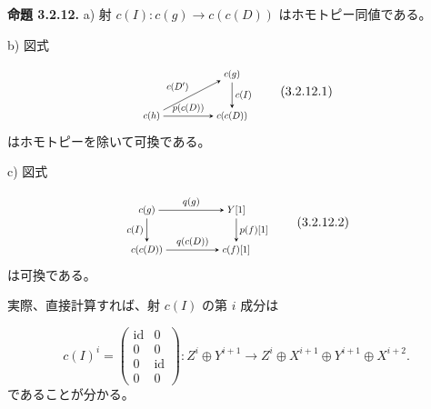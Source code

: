 \clearpage
{}%
\begingroup
\setlength{\abovedisplayskip}{4pt plus 2pt minus 2pt}%
\setlength{\belowdisplayskip}{4pt plus 2pt minus 2pt}%
\noindent\textbf{命題 3.2.12.}\quad
{}
a) 射 $c(I)\colon c(g)\longrightarrow c(c(D))$ はホモトピー同値である。

b) 図式

\begin{equation}
  \begin{tikzpicture}[>=stealth,baseline=(current bounding box.center),scale=0.74,
    every node/.style={transform shape}]
    \node (Ch) at (0,0) {$c(h)$};
    \node (Cg) at (3.0,1.55) {$c(g)$};
    \node (CcD) at (3.0,0) {$c(c(D))$};
    \draw[->] (Ch) -- node[above left] {$c(D')$} (Cg);
    \draw[->] (Cg) -- node[right] {$c(I)$} (CcD);
    \draw[->] (Ch) -- node[above] {$p(c(D))$} (CcD);
  \end{tikzpicture}
  \tag{3.2.12.1}
\end{equation}
はホモトピーを除いて可換である。

c) 図式

\begin{equation}
  \begin{tikzpicture}[>=stealth,baseline=(current bounding box.center),scale=0.76,
    every node/.style={transform shape}]
    \node (Cg) at (0,1.45) {$c(g)$};
    \node (Y) at (3.25,1.45) {$Y[1]$};
    \node (CcD) at (0,0) {$c(c(D))$};
    \node (Cf) at (3.25,0) {$c(f)[1]$};
    \draw[->] (Cg) -- node[above] {$q(g)$} (Y);
    \draw[->] (Cg) -- node[left] {$c(I)$} (CcD);
    \draw[->] (Y) -- node[right] {$p(f)[1]$} (Cf);
    \draw[->] (CcD) -- node[above] {$q(c(D))$} (Cf);
  \end{tikzpicture}
  \tag{3.2.12.2}
\end{equation}
は可換である。

実際、直接計算すれば、射 $c(I)$ の第 $i$ 成分は

\begin{equation}
  c(I)^i=
  \begin{pmatrix}
    \operatorname{id}&0\\
    0&0\\
    0&\operatorname{id}\\
    0&0
  \end{pmatrix}
  \colon Z^i\oplus Y^{i+1}\longrightarrow
  Z^i\oplus X^{i+1}\oplus Y^{i+1}\oplus X^{i+2}.
  \tag{3.2.12.3}
\end{equation}
であることが分かる。

